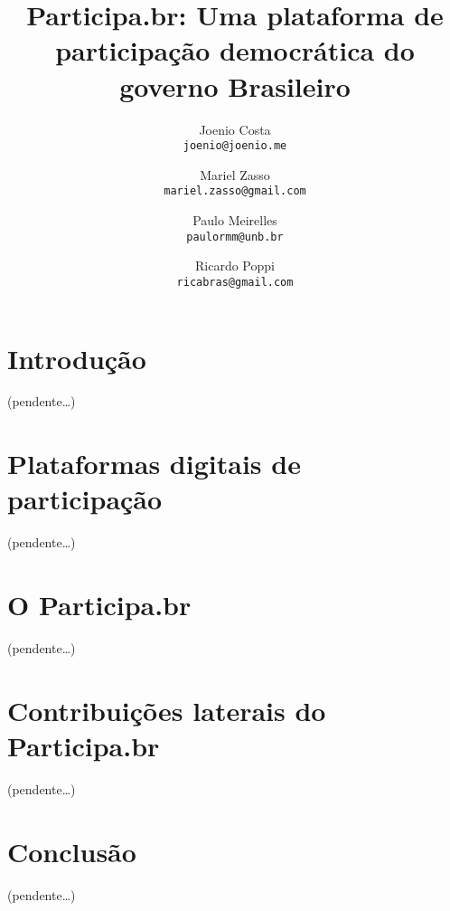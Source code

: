 \documentclass{article}
\title{
  Participa.br: Uma plataforma de participação democrática do governo Brasileiro
}
\author{
  Joenio Costa\\
  \texttt{joenio@joenio.me}
  \and
  Mariel Zasso\\
  \texttt{mariel.zasso@gmail.com}
  \and
  Paulo Meirelles\\
  \texttt{paulormm@unb.br}
  \and
  Ricardo Poppi\\
  \texttt{ricabras@gmail.com}
}
\begin{document}
\maketitle

\section{Introdução}


(pendente\ldots)

\section{Plataformas digitais de participação}

(pendente\ldots)


\section{O Participa.br}

(pendente\ldots)

%
%

\section{Contribuições laterais do Participa.br}

(pendente\ldots)


\section{Conclusão}

(pendente\ldots)



\appendix
\end{document}
